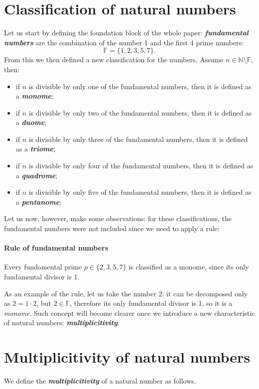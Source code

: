 \documentclass{article}
\begin{document}
\section{Classification of natural numbers}
Let us start by defining the foundation block of the whole paper: \textit{\textbf{fundamental numbers}} are the combination of the number 1 and the first 4 prime numbers:
$$
\mathbb{F} = \{1, 2, 3, 5, 7\}.
$$
From this we then defined a new classification for the numbers. Assume $n\in\mathbb{N}\setminus \mathbb{F}$, then:
\begin{itemize}
    \item if $n$ is divisible by only one of the fundamental numbers, then it is defined as a \textit{\textbf{monome}};
    \item if $n$ is divisible by only two of the fundamental numbers, then it is defined as a \textit{\textbf{duome}};
    \item if $n$ is divisible by only three of the fundamental numbers, then it is defined as a \textit{\textbf{triome}};
    \item if $n$ is divisible by only four of the fundamental numbers, then it is defined as a \textit{\textbf{quadrome}};
    \item if $n$ is divisible by only five of the fundamental numbers, then it is defined as a \textit{\textbf{pentanome}};
\end{itemize}
Let us now, however, make some observations: for these classifications, the fundamental numbers were not included since we need to apply a rule:
\paragraph{Rule of fundamental numbers} Every fundamental prime $p \in \{2,3,5,7\} $ is classified as a monome, since its only fundamental divisor is 1.

As an example of the rule, let us take the number 2: it can be decomposed only as $2 = 1\cdot 2$, but $2\in \mathbb{F}$, therefore its only fundamental divisor is 1, so it is a \textit{monome}. Such concept will become clearer once we introduce a new characteristic of natural numbers: \textit{\textbf{multiplicitivity}}.

\section{Multiplicitivity of natural numbers}
We define the \textbf{\textit{multiplicitivity}} of a natural number as follows.
\end{document}
